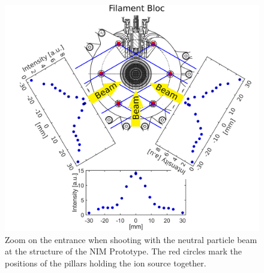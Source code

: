	\begin{figure}[h!]
		\centering
		\includegraphics[width=\textwidth]{Experiments/Entrence_Proto_topview.png}
		\caption{Zoom on the entrance when shooting with the neutral particle beam at the structure of the NIM Prototype. The red circles mark the positions of the pillars holding the ion source together.}
		\label{exp:ProtoIntCharEnt}
	\end{figure}
	
